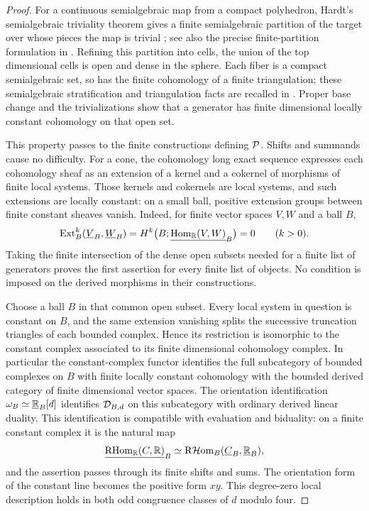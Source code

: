 \begin{proof}
For a continuous semialgebraic map from a compact polyhedron,
Hardt's semialgebraic triviality theorem gives a finite
semialgebraic partition of the target over whose pieces the map
is trivial \cite[main theorem]{Hardt1980}; see also the precise
finite-partition formulation in \cite[Theorem~4.1]{Coste2000}. Refining
this partition into cells,
the union of the top dimensional cells is open and dense in the
sphere.  Each fiber is a compact semialgebraic set, so has the
finite cohomology of a finite triangulation; these semialgebraic
stratification and triangulation facts are recalled in
\cite[\S2.1, pp.~2481--2483]{HardtLambrechtsTurchinVolic2011}.
Proper base change
and the trivializations show that a generator has finite
dimensional locally constant cohomology on that open set.

This property passes to the finite constructions defining
$\mathcal P$.  Shifts and summands cause no difficulty.  For a cone,
the cohomology long exact sequence expresses each cohomology
sheaf as an extension of a kernel and a cokernel of morphisms of
finite local systems.  Those kernels and cokernels are local
systems, and such extensions are locally constant: on a small
ball, positive extension groups between finite constant sheaves
vanish.  Indeed, for finite vector spaces $V,W$ and a ball $B$,
\[
 \operatorname{Ext}^k_B(\underline{V}_{B},\underline{W}_{B})
 =H^k\bigl(B;\underline{\operatorname{Hom}_{\mathbb R}(V,W)}_{B}\bigr)=0\qquad(k>0).
\]
Taking the finite intersection of the dense open subsets needed
for a finite list of generators proves the first assertion for
every finite list of objects.  No condition is imposed on the
derived morphisms in their constructions.

Choose a ball $B$ in that common open subset.  Every local system
in question is constant on $B$, and the same extension vanishing
splits the successive truncation triangles of each bounded
complex.  Hence its restriction is isomorphic to the constant
complex associated to its finite dimensional cohomology complex.
In particular the constant-complex functor identifies the full
subcategory of bounded complexes on $B$ with finite locally
constant cohomology with the bounded derived category of finite
dimensional vector spaces.  The orientation
identification $\omega_B\simeq\underline{\mathbb R}_{B}[d]$ identifies
$\mathcal D_{B,d}$ on this subcategory with ordinary derived linear
duality.  This identification is compatible with evaluation and
biduality: on a finite constant complex it is the natural map
\[
 \underline{\operatorname{RHom}_{\mathbb R}(C,\mathbb R)}_{B}
 \simeq
 \operatorname{R\mathcal Hom}_B(\underline{C}_{B},\underline{\mathbb R}_{B}),
\]
and the assertion passes through its finite shifts and sums.
The orientation form of the constant line becomes the positive
form $xy$.  This degree-zero local description holds in both odd
congruence classes of $d$ modulo four.


\end{proof}
